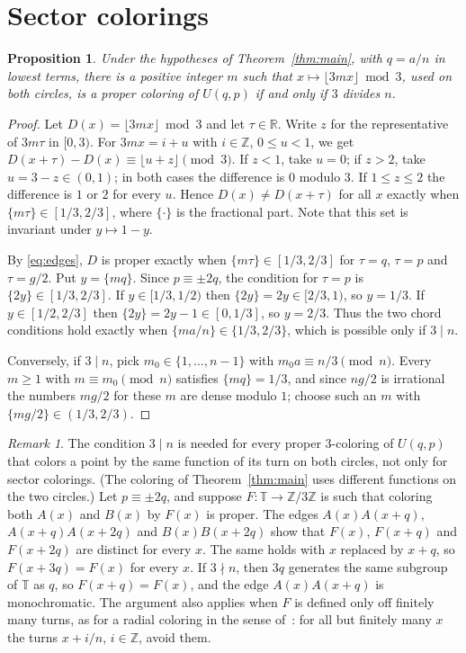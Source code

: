 \documentclass[11pt]{amsart}
\newtheorem{proposition}[theorem]{Proposition}
\theoremstyle{remark}
\newtheorem{remark}[theorem]{Remark}
\numberwithin{equation}{section}
\newcommand{\T}{\mathbb{T}}
\newcommand{\Z}{\mathbb{Z}}
\begin{document}
\section{Sector colorings}\label{sec:common}

\begin{proposition}\label{prop:common}
Under the hypotheses of Theorem~\ref{thm:main}, with $q=a/n$ in lowest
terms, there is a positive integer $m$ such that
$x\mapsto\lfloor3mx\rfloor\bmod3$, used on both circles, is a proper
coloring of $U(q,p)$ if and only if $3$ divides $n$.
\end{proposition}

\begin{proof}
Let $D(x)=\lfloor3mx\rfloor\bmod3$ and let $\tau\in\mathbb R$. Write
$z$ for the representative of $3m\tau$ in $[0,3)$. For $3mx=i+u$ with
$i\in\Z$, $0\le u<1$, we get $D(x+\tau)-D(x)\equiv\lfloor u+z\rfloor\pmod3$.
If $z<1$, take $u=0$; if $z>2$, take $u=3-z\in(0,1)$; in both cases the
difference is $0$ modulo $3$. If $1\le z\le2$ the difference is $1$ or
$2$ for every $u$. Hence $D(x)\ne D(x+\tau)$ for all $x$ exactly when
$\{m\tau\}\in[1/3,2/3]$, where $\{\cdot\}$ is the fractional part. Note
that this set is invariant under $y\mapsto1-y$.

By \eqref{eq:edges}, $D$ is proper exactly when $\{m\tau\}\in[1/3,2/3]$
for $\tau=q$, $\tau=p$ and $\tau=g/2$. Put $y=\{mq\}$. Since
$p\equiv\pm2q$, the condition for $\tau=p$ is $\{2y\}\in[1/3,2/3]$. If
$y\in[1/3,1/2)$ then $\{2y\}=2y\in[2/3,1)$, so $y=1/3$. If
$y\in[1/2,2/3]$ then $\{2y\}=2y-1\in[0,1/3]$, so $y=2/3$. Thus the two
chord conditions hold exactly when $\{ma/n\}\in\{1/3,2/3\}$, which is
possible only if $3\mid n$.

Conversely, if $3\mid n$, pick $m_0\in\{1,\dots,n-1\}$ with $m_0a\equiv n/3\pmod n$. Every
$m\ge1$ with $m\equiv m_0\pmod n$ satisfies $\{mq\}=1/3$, and since $ng/2$ is
irrational the numbers $mg/2$ for these $m$ are dense modulo $1$; choose
such an $m$ with $\{mg/2\}\in(1/3,2/3)$.
\end{proof}

\begin{remark}\label{rem:radial}
The condition $3\mid n$ is needed for every proper $3$-coloring of
$U(q,p)$ that colors a point by the same function of its turn on both
circles, not only for sector colorings. (The coloring of
Theorem~\ref{thm:main} uses different functions on the two circles.)
Let $p\equiv\pm2q$, and suppose $F:\T\to\Z/3\Z$ is such that coloring
both $A(x)$ and $B(x)$ by $F(x)$ is proper. The edges $A(x)A(x+q)$,
$A(x+q)A(x+2q)$ and $B(x)B(x+2q)$ show that $F(x)$, $F(x+q)$ and
$F(x+2q)$ are distinct for every $x$. The same holds with $x$ replaced
by $x+q$, so $F(x+3q)=F(x)$ for every $x$. If $3\nmid n$, then $3q$
generates the same subgroup of $\T$ as $q$, so $F(x+q)=F(x)$, and the
edge $A(x)A(x+q)$ is monochromatic. The argument also applies when $F$
is defined only off finitely many turns, as for a radial coloring
in the sense of~\cite{AM14}: for all but finitely many $x$ the turns
$x+i/n$, $i\in\Z$, avoid them.
\end{remark}
\end{document}
